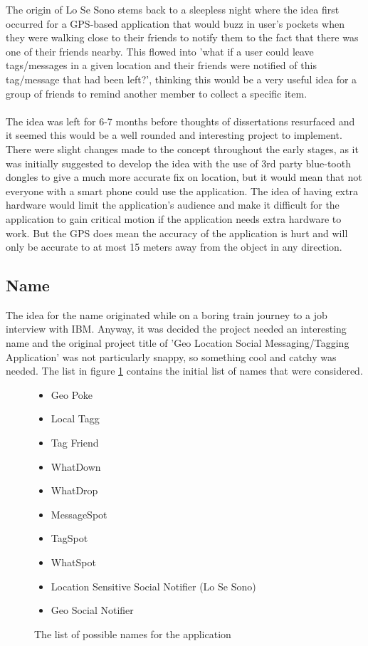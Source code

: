 The origin of Lo Se Sono stems back to a sleepless night where the idea first occurred for a GPS-based application that would buzz in user's pockets when they were walking close to their friends to notify them to the fact that there was one of their friends nearby. This flowed into 'what if a user could leave tags/messages in a given location and their friends were notified of this tag/message that had been left?', thinking this would be a very useful idea for a group of friends to remind another member to collect a specific item.\\
\\
The idea was left for 6-7 months before thoughts of dissertations resurfaced and it seemed this would be a well rounded and interesting project to implement. There were slight changes made to the concept throughout the early stages, as it was initially suggested to develop the idea with the use of 3rd party blue-tooth dongles to give a much more accurate fix on location, but it would mean that not everyone with a smart phone could use the application. The idea of having extra hardware would limit the application's audience and make it difficult for the application to gain critical motion if the application needs extra hardware to work. But the GPS does mean the accuracy of the application is hurt and will only be accurate to at most 15 meters away from the object in any direction.

\subsection{Name}

The idea for the name originated while on a boring train journey to a job interview with IBM. Anyway, it was decided the project needed an interesting name and the original project title of 'Geo Location Social Messaging/Tagging Application' was not particularly snappy, so something cool and catchy was needed. The list in figure \ref{fig:list_of_names} contains the initial list of names that were considered. 

\begin{figure}[H]
\begin{itemize}
\item Geo Poke
\item Local Tagg
\item Tag Friend
\item WhatDown
\item WhatDrop
\item MessageSpot
\item TagSpot
\item WhatSpot
\item Location Sensitive Social Notifier (Lo Se Sono)
\item Geo Social Notifier
\end{itemize}
\caption{The list of possible names for the application}
\label{fig:list_of_names}
\end{figure}

